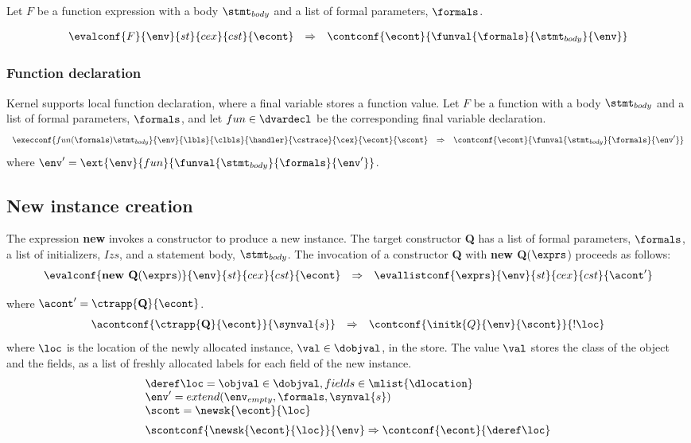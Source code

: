 \documentclass{article}
\begin{document}
Let $F$ be a function expression with a body $\stmt_{body}$ and a list of formal parameters, $\formals$.

\[
  \begin{array}{lcl}
	\evalconf{F}{\env}{st}{cex}{cst}{\econt}
	& \Rightarrow &
	\contconf{\econt}{\funval{\formals}{\stmt_{body}}{\env}}
  \end{array}
\]
\subsubsection{Function declaration}
Kernel supports local function declaration, where a final variable stores a function value. 
Let $F$ be a function with a body $\stmt_{body}$ and a list of formal parameters, $\formals$, and let $fun \in \dvardecl$ be the corresponding final variable declaration.
\[
  \begin{array}{lcl}
	\execconf{fun(\formals) \stmt_{body}}{\env}{\lbls}{\clbls}{\handler}{\cstrace}{\cex}{\econt}{\scont}
	& \Rightarrow &
	\contconf{\econt}{\funval{\stmt_{body}}{\formals}{\env'}}
  \end{array}
\]
where $\env' = \ext{\env}{fun}{\funval{\stmt_{body}}{\formals}{\env'}}$.

\subsection{New instance creation}

The expression \textbf{new} invokes a constructor to produce a new instance. The target constructor \textbf{Q} has a list of formal parameters, $\formals$, a list of initializers, $Izs$, and a statement body, $\stmt_{body}$. The invocation of a constructor \textbf{Q} with \textbf{new Q}($\exprs$) proceeds as follows:
\[
  \begin{array}{lcl}
	\evalconf{\textbf{new Q}(\exprs)}{\env}{st}{cex}{cst}{\econt}
	& \Rightarrow &
	\evallistconf{\exprs}{\env}{st}{cex}{cst}{\acont'}\\[2mm]
  \end{array}
\]
where $\acont' = \ctrapp{\textbf{Q}}{\econt}$.
\[
  \begin{array}{lcl}
	\acontconf{\ctrapp{\textbf{Q}}{\econt}}{\synval{s}}
	& \Rightarrow &
	\contconf{\initk{Q}{\env}{\scont}}{!\loc}
  \end{array}
\]
\noindent
where $\loc$ is the location of the newly allocated instance, $\val \in \dobjval$, in the store. The value $\val$ stores the class of the object and the fields, as a list of freshly allocated labels for each field of the new instance.
\[
  \begin{array}{l}
	\deref\loc = \objval \in \dobjval, fields \in \mlist{\dlocation}\\
	\env' = extend(\env_{empty}, \formals, \synval{s})\\
	\scont = \newsk{\econt}{\loc} \\[2mm]

	\scontconf{\newsk{\econt}{\loc}}{\env}
	\Rightarrow
	\contconf{\econt}{\deref\loc}
  \end{array}
\]
\end{document}
